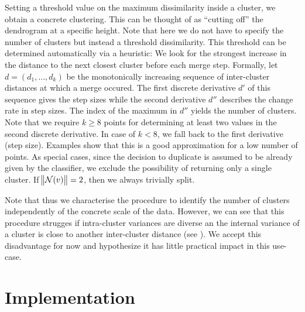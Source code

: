 \documentclass[
	fontsize=10pt, %
	twoside=false, %
	secnumdepth=1, %
  toc=indentunnumbered %
]{kaobook}
\begin{document}
Setting a threshold value on the maximum dissimilarity inside a cluster, we
obtain a concrete clustering. This can be thought of as ``cutting off'' the
dendrogram at a specific height. Note that here we do not have to specify the
number of clusters but instead a threshold dissimilarity. This threshold can be
determined automatically via a heuristic:
We look for the strongest increase in the distance to
the next closest cluster before each merge step. Formally, let $d = (d_1, ..., d_k)$
be the monotonically increasing sequence of inter-cluster distances at which a
merge occured. The first discrete derivative $d'$ of this sequence gives the step
sizes while the second derivative $d''$ describes the change rate in step sizes. The
index of the maximum in $d''$ yields the number of clusters.
Note that we require $k \geq 8$ points for determining at least two values in the second
discrete derivative. In case of $k < 8$, we fall back to the first derivative
(step size). Examples show that this is a good approximation for a low number of points.
%
As special cases, since the decision to duplicate is assumed to be already given
by the classifier, we exclude the possibility of returning only a single
cluster. If $\norm{\mathcal{N}(v)}=2$, then we always trivially split. 

Note that thus we characterise the procedure to identify the number of clusters
independently of the concrete scale of the data. However,
we can see that this procedure strugges if
intra-cluster variances are diverse an the internal variance of a
cluster is close to another inter-cluster distance (see ).
We accept this disadvantage
for now and hypothesize it has little practical impact in this use-case.



\section{Implementation}


\end{document}
